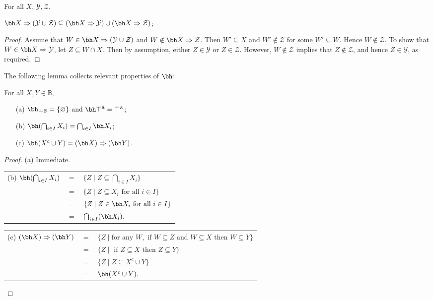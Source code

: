 \begin{lemma}
\label{lemma: soundness of rules}
For all $X$, $\mathcal{Y},\mathcal{Z}$,
\begin{center} \label{lem:sem:item2}
$\bh X\Rightarrow (\mathcal{Y}\cup \mathcal{Z})\subseteq (\bh X\Rightarrow \mathcal{Y})\cup (\bh X\Rightarrow \mathcal{Z})$;
\end{center}
\end{lemma}
\begin{proof}
Assume that $W\in \bh X\Rightarrow (\mathcal{Y}\cup \mathcal{Z})$ and $W\notin \bh X\Rightarrow \mathcal{Z}$. Then $W'\subseteq X$ and $W'\notin \mathcal{Z}$ for some $W'\subseteq W$. Hence $W\notin \mathcal{Z}$. To show that $W\in \bh X\Rightarrow \mathcal{Y}$, let $Z\subseteq W\cap X$. Then by assumption, either  $Z\in \mathcal{Y}$ or $Z\in \mathcal{Z}$. However, $W\notin \mathcal{Z}$ implies that $Z\notin \mathcal{Z}$, and hence $Z\in \mathcal{Y}$, as required.
\end{proof}










The following lemma collects  relevant  properties of $\bh$:
\begin{lemma}
\label{lemma:properties of bh}
For all $X,Y\in \mathbb{B}$,
\begin{itemize}
\item[(a)] $\bh \bot_\mathbb{B}=\{\varnothing\}$  and $\bh \top^\mathbb{B}=\top^\mathbb{A}$;
\item[(b)] $\bh(\bigcap_{i\in I}X_i)=\bigcap_{i\in I}\bh X_i$;
\item[(c)] $\bh(X^c\cup Y)=(\bh X)\Rightarrow (\bh Y)$.
\end{itemize}
\end{lemma}


 \begin{proof}
(a) Immediate.\\

\noindent 
\begin{tabular}{r c l}
(b) $\bh(\bigcap_{i\in I} X_i)$ &$ =$&$\{Z\mid Z\subseteq \bigcap_{i\in I} X_i\}$\\
&$ =$&$\{Z\mid  Z\subseteq X_i \mbox{ for all } i\in I\}$\\
&$ =$&$\{Z\mid  Z\in \bh X_i \text{ for all } i\in I\}$\\
&$ =$&$\bigcap_{i\in I} (\bh X_i).$\\
\end{tabular}



\noindent 
\begin{tabular}{r c l}
(c) $(\bh X)\Rightarrow (\bh Y)$ &$ =$&$\{Z\mid \mbox{for any } W, \mbox{ if } W\subseteq Z \mbox{ and } W\subseteq X \mbox{ then } W\subseteq Y\}$\\
&$ =$&$\{Z\mid  \mbox{ if }  Z\subseteq X \mbox{ then } Z\subseteq Y\}$\\
&$ =$&$\{Z\mid   Z\subseteq X^c\cup Y\}$\\
&$ =$&$\bh ( X^c\cup Y).$
\end{tabular}
\end{proof}

